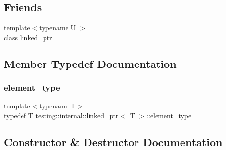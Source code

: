 \subsection*{Friends}
\begin{DoxyCompactItemize}
\item 
{\footnotesize template$<$typename U $>$ }\\class \mbox{\hyperlink{classtesting_1_1internal_1_1linked__ptr_a7763f286ca03a7f7363a033d996c8c1c}{linked\+\_\+ptr}}
\end{DoxyCompactItemize}


\subsection{Member Typedef Documentation}
\mbox{\label{classtesting_1_1internal_1_1linked__ptr_a295c7d1ee4100d916514c4e4385a0063}} 
\subsubsection{\texorpdfstring{element\_type}{element\_type}}
{\footnotesize\ttfamily template$<$typename T$>$ \\
typedef T \mbox{\hyperlink{classtesting_1_1internal_1_1linked__ptr}{testing\+::internal\+::linked\+\_\+ptr}}$<$ T $>$\+::\mbox{\hyperlink{classtesting_1_1internal_1_1linked__ptr_a295c7d1ee4100d916514c4e4385a0063}{element\+\_\+type}}}



\subsection{Constructor \& Destructor Documentation}
\mbox{\label{classtesting_1_1internal_1_1linked__ptr_ae805418b9f03f14ff49649e710475dba}} 
